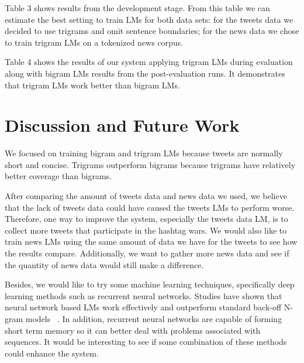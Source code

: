 \documentclass[11pt,a4paper]{article}
\begin{document}
Table 3 shows results from the development stage. From this table we can estimate the best setting to train LMs for both data sets: for the tweets data we decided to use trigrams and omit sentence boundaries; for the news data we chose to train trigram LMs on a tokenized news corpus.

Table 4 shows the results of our system applying trigram LMs during evaluation along with bigram LMs results from the post-evaluation runs. It demonstrates that trigram LMs work better than bigram LMs.


\section{Discussion and Future Work}
We focused on training bigram and trigram LMs because tweets are normally short and concise. Trigrams outperform bigrams because trigrams have relatively better coverage than bigrams. 

After comparing the amount of tweets data and news data we used, we believe that the lack of tweets data could have caused the tweets LMs to perform worse. Therefore, one way to improve the system, especially the tweets data LM, is to collect more tweets that participate in the hashtag wars. We would also like to train news LMs using the same amount of data we have for the tweets to see how the results compare. Additionally, we want to gather more news data and see if the quantity of news data would still make a difference. 

Besides, we would like to try some machine learning techniques, specifically deep learning methods such as recurrent neural networks. Studies have shown that neural network based LMs work effectively and outperform standard back-off N-gram models ~\cite{mikolov2011extensions}. In addition, recurrent neural networks are capable of forming short term memory so it can better deal with problems associated with sequences. It would be interesting to see if some combination of these methods could enhance the system.




%
%


\end{document}
